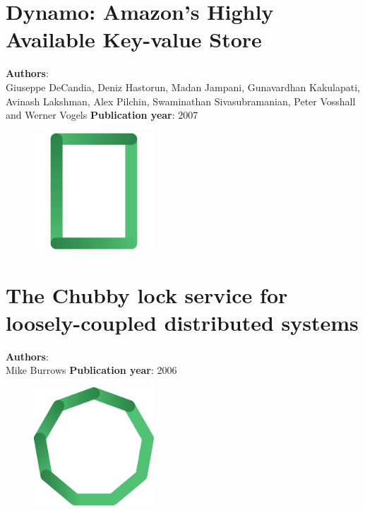 \documentclass[11pt,fleqn]{book} %
\begin{document}
\chapter{Dynamo: Amazon’s Highly Available Key-value Store}
\vspace*{-7mm}
\Large \textbf{Authors}: \\
Giuseppe DeCandia, Deniz Hastorun, Madan Jampani, Gunavardhan Kakulapati, Avinash Lakshman, Alex Pilchin, Swaminathan Sivasubramanian, Peter Vosshall and Werner Vogels
\newline\newline
\textbf{Publication year}: 2007
\begin{figure}[b]
    \centering
    \includegraphics[width=0.4\textwidth]{distributed-systems-rectangle.pdf}
\end{figure}


\chapter{The Chubby lock service for loosely-coupled distributed systems}
\vspace*{-7mm}
\Large \textbf{Authors}: \\
Mike Burrows
\newline\newline
\textbf{Publication year}: 2006
\begin{figure}[b]
    \centering
    \includegraphics[width=0.4\textwidth]{distributed-systems.pdf}
\end{figure}

\end{document}
